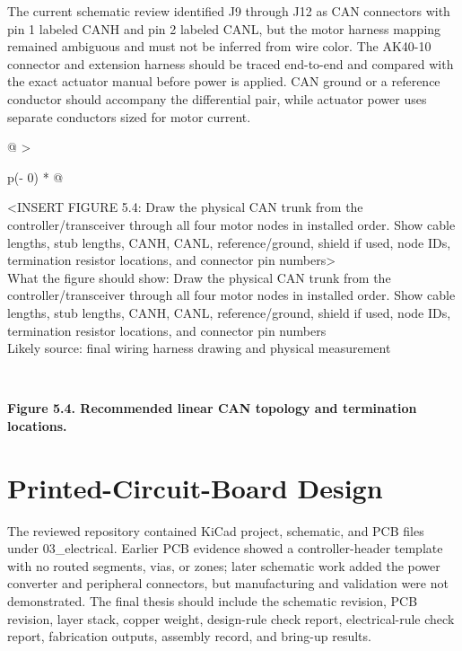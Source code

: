 The current schematic review identified J9 through J12 as CAN connectors
with pin 1 labeled CANH and pin 2 labeled CANL, but the motor harness
mapping remained ambiguous and must not be inferred from wire color. The
AK40-10 connector and extension harness should be traced end-to-end and
compared with the exact actuator manual before power is applied. CAN
ground or a reference conductor should accompany the differential pair,
while actuator power uses separate conductors sized for motor current.

\begin{longtable}[]{@{}
  >{\raggedright\arraybackslash}p{(\columnwidth - 0\tabcolsep) * }@{}}
\toprule\noalign{}
\begin{minipage}[b]{\linewidth}\raggedright
\textless INSERT FIGURE 5.4: Draw the physical CAN trunk from the
controller\slash{}transceiver through all four motor nodes in installed order.
Show cable lengths, stub lengths, CANH, CANL, reference\slash{}ground, shield
if used, node IDs, termination resistor locations, and connector pin
numbers\textgreater{}\\
What the figure should show: Draw the physical CAN trunk from the
controller\slash{}transceiver through all four motor nodes in installed order.
Show cable lengths, stub lengths, CANH, CANL, reference\slash{}ground, shield
if used, node IDs, termination resistor locations, and connector pin
numbers\\
Likely source: final wiring harness drawing and physical
measurement\strut
\end{minipage} \\
\midrule\noalign{}
\endhead
\bottomrule\noalign{}
\endlastfoot
\end{longtable}

\begin{center}\singlespacing
{}
\textbf{Figure 5.4. Recommended linear CAN topology and termination locations.}
\end{center}

\section{Printed-Circuit-Board Design}\label{printed-circuit-board-design}

The reviewed repository contained KiCad project, schematic, and PCB
files under 03\_electrical. Earlier PCB evidence showed a
controller-header template with no routed segments, vias, or zones;
later schematic work added the power converter and peripheral
connectors, but manufacturing and validation were not demonstrated. The
final thesis should include the schematic revision, PCB revision, layer
stack, copper weight, design-rule check report, electrical-rule check
report, fabrication outputs, assembly record, and bring-up results.

